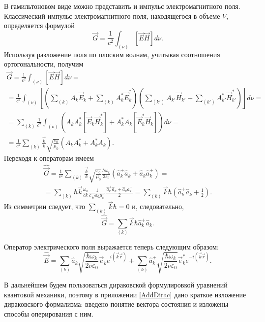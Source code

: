 В гамильтоновом виде можно представить и импульс электромагнитного 
поля. Классический импульс электромагнитного поля, находящегося в
объеме  $V$,  определяется формулой 
\begin{equation}
\vec{G} = \frac{1}{c^2} \int_{(\nu)}
\left[\vec{E} \vec{H} \right] d \nu.
\label{eqCh1_task3_1}
\end{equation}
Используя разложение поля по плоским волнам, учитывая соотношения
ортогональности, получим
\begin{eqnarray}
  \vec{G} = \frac{1}{c^2} \int_{(\nu)}
  \left[\vec{E} \vec{H} \right] d \nu =
  \nonumber \\
  =
  \frac{1}{c^2} \int_{(\nu)}
  \left[
    \left(\sum_{(k)} A_k \vec{E}_k +
    \sum_{(k)} A_k^\ast \vec{E}_k^\ast \right)
    \left(\sum_{(k')} A_{k'} \vec{H}_{k'} +
    \sum_{(k')} A_{k'}^\ast \vec{H}_{k'}^\ast \right)\right]
  d \nu =
  \nonumber \\
  =
  \sum_{(k)}
  \frac{1}{c^2} \int_{(\nu)}
  \left(
  A_k A_k^\ast \left[\vec{E}_k \vec{H}_k^\ast \right]
  +
  A_k^\ast A_k \left[\vec{E}_k^\ast \vec{H}_k \right]
  \right)
  d \nu =
  \nonumber \\
  =
  \frac{1}{c^2} \sum_{(k)} \frac{\vec{k}}{k}
  \sqrt{\frac{\varepsilon_0}{\mu_0}}
  \left(
  A_k A_k^\ast + A_k^\ast A_k
  \right).
  \nonumber
\end{eqnarray}
Переходя к операторам имеем
\begin{eqnarray}
  \hat{\vec{G}} =
  \frac{1}{c^2} \sum_{(k)} \frac{\vec{k}}{k}
  \sqrt{\frac{\varepsilon_0}{\mu_0}}
  \frac{\hbar \omega_k}{2 \varepsilon_0}
  \left(\hat{a}_k^{+} \hat{a}_k + \hat{a}_k \hat{a}_k^{+}\right)
  =
  \nonumber \\
  =
  \sum_{(k)}
  \hbar
  \vec{k}
  \frac{\omega_k}{c k}
  \frac{1}{c \sqrt{\varepsilon_0 \mu_0}}
  \frac{\hat{a}_k^{+} \hat{a}_k + \hat{a}_k \hat{a}_k^{+}}{2}
  =
  \sum_{(k)} \vec{k} \hbar\left( \hat{a}_k^{+} \hat{a}_k +
\frac{1}{2} \right).
\nonumber
\end{eqnarray}
Из симметрии  следует, что $\sum_{(k)} \vec{k} \hbar = 0$ и, следовательно, 
\begin{equation}
\hat{\vec{G}} = \sum_{(k)} \vec{k} \hbar\hat{a}_k^{+} \hat{a}_k.
\label{eqCh1_task3_2}
\end{equation}

Оператор электрического поля выражается теперь следующим образом:
\begin{equation}
\hat{\vec{E}} = \sum_{(k)} \hat{a}_k\sqrt{\frac{\hbar \omega_k}{2 \nu
    \varepsilon_0}} \vec{e}_k e^{i\left(\vec{k}\vec{r}\right)} +
\sum_{(k)} \hat{a}_k^{+}\sqrt{\frac{\hbar \omega_k}{2 \nu
    \varepsilon_0}} \vec{e}_k^{*} e^{-i\left(\vec{k}\vec{r}\right)}.
\end{equation}

В дальнейшем будем пользоваться дираковской формулировкой уравнений
квантовой механики, поэтому в приложении \ref{AddDirac} дано краткое
изложение дираковского формализма: введено понятие вектора состояния и
изложены способы оперирования с ним.  
